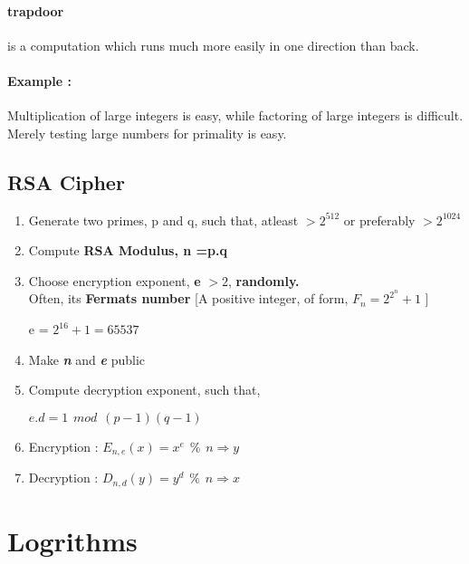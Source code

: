 \documentclass[12pt]{article}
\begin{document}
\paragraph{trapdoor } is a computation which runs much more easily in one direction than back.

\paragraph{Example : }Multiplication of large integers is easy, while factoring of large integers is difficult.\\
Merely testing large numbers for primality is easy.

\subsection{RSA Cipher}
\begin{enumerate}
\item Generate two primes, p and q, such that, atleast $>2^{512}$ or preferably $>2^{1024}$
\item Compute \textbf{RSA Modulus, n =p.q}
\item Choose encryption exponent, \textbf{e} $> 2$, \textbf{randomly.} \\
Often, its \textbf{Fermats number} [A positive integer, of form, \textbf{$F_{n}=2^{2^{n}} + 1$} ]\\
\begin{center}
e = $2^{16} +1 = 65537$
\end{center}
\item Make \textbf{\textit{n}} and \textbf{\textit{e}} public
\item Compute decryption exponent, such that,\\
\begin{center}
$e.d = 1 \hspace{5pt} mod \hspace{5pt} (p-1)(q-1)$
\end{center}
\item Encryption : $E_{n,e}(x) = x ^{e} \hspace{5pt} \% \hspace{5pt}n \Rightarrow y $
\item Decryption : $D_{n,d}(y) = y ^{d} \hspace{5pt} \% \hspace{5pt}n \Rightarrow x $
\end{enumerate}

\pagebreak
\section{Logrithms}
\end{document}
